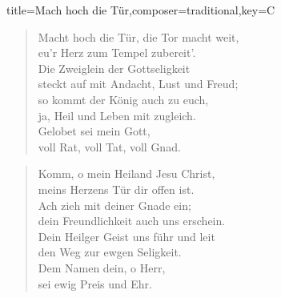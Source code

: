 \documentclass{leadsheet-modern}
\begin{document}
\begin{song}[transpose=+2
]{title={Mach hoch die Tür},composer={traditional},key={C}}
\begin{verse}
Macht hoch die Tür, die Tor macht weit, \\
eu’r Herz zum Tempel zubereit’. \\
Die Zweiglein der Gottseligkeit \\
steckt auf mit Andacht, Lust und Freud; \\
so kommt der König auch zu euch, \\
ja, Heil und Leben mit zugleich. \\
Gelobet sei mein Gott, \\
voll Rat, voll Tat, voll Gnad. \\
\end{verse}

\begin{verse}
Komm, o mein Heiland Jesu Christ, \\
meins Herzens Tür dir offen ist. \\
Ach zieh mit deiner Gnade ein; \\
dein Freundlichkeit auch uns erschein. \\
Dein Heilger Geist uns führ und leit \\
den Weg zur ewgen Seligkeit. \\
Dem Namen dein, o Herr, \\
sei ewig Preis und Ehr.
\end{verse}

\end{song}
\end{document}

